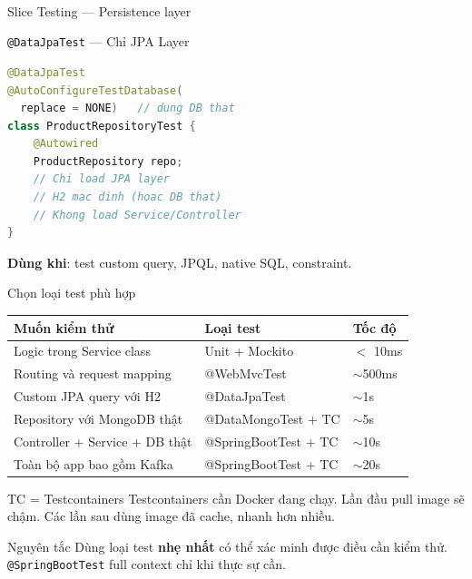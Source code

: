 \documentclass[aspectratio=169,10pt]{beamer}
\newcommand{\sref}[1]{\textsuperscript{\scriptsize\cite{#1}}}
\begin{document}
\begin{frame}[fragile]{Slice Testing --- Persistence layer\sref{spring-boot-testing}}
    \begin{block}{\texttt{@DataJpaTest} --- Chỉ JPA Layer}
\begin{lstlisting}[language=Java,style=small]
@DataJpaTest
@AutoConfigureTestDatabase(
  replace = NONE)   // dung DB that
class ProductRepositoryTest {
    @Autowired
    ProductRepository repo;
    // Chi load JPA layer
    // H2 mac dinh (hoac DB that)
    // Khong load Service/Controller
}
\end{lstlisting}
      \textbf{Dùng khi}: test custom query,
      JPQL, native SQL, constraint.
    \end{block}
\end{frame}

\begin{frame}{Chọn loại test phù hợp}
  \begin{center}
  \small
  \begin{tabular}{p{4cm}p{3cm}p{2.5cm}}
    \toprule
    \textbf{Muốn kiểm thử} & \textbf{Loại test} & \textbf{Tốc độ} \\
    \midrule
    Logic trong Service class         & Unit + Mockito        & $<$ 10ms \\
    Routing và request mapping        & @WebMvcTest           & $\sim$500ms \\
    Custom JPA query với H2           & @DataJpaTest          & $\sim$1s \\
    Repository với MongoDB thật       & @DataMongoTest + TC   & $\sim$5s \\
    Controller + Service + DB thật    & @SpringBootTest + TC  & $\sim$10s \\
    Toàn bộ app bao gồm Kafka         & @SpringBootTest + TC  & $\sim$20s \\
    \bottomrule
  \end{tabular}
  \end{center}

  \vspace{0.3em}
  \begin{block}{TC = Testcontainers}
    Testcontainers cần Docker đang chạy. Lần đầu pull image sẽ chậm.
    Các lần sau dùng image đã cache, nhanh hơn nhiều.
  \end{block}

  \begin{alertblock}{Nguyên tắc}
    Dùng loại test \textbf{nhẹ nhất} có thể xác minh được điều cần kiểm thử.
    \texttt{@SpringBootTest} full context chỉ khi thực sự cần.
  \end{alertblock}
\end{frame}
\end{document}
